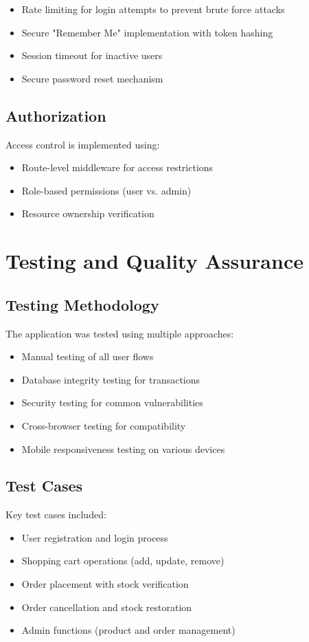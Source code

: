 \documentclass[14pt,a4paper]{article}
\begin{document}
\begin{itemize}
	\item Rate limiting for login attempts to prevent brute force attacks
	\item Secure "Remember Me" implementation with token hashing
	\item Session timeout for inactive users
	\item Secure password reset mechanism
\end{itemize}

\subsection{Authorization}
Access control is implemented using:

\begin{itemize}
	\item Route-level middleware for access restrictions
	\item Role-based permissions (user vs. admin)
	\item Resource ownership verification
\end{itemize}

\section{Testing and Quality Assurance}

\subsection{Testing Methodology}
The application was tested using multiple approaches:

\begin{itemize}
	\item Manual testing of all user flows
	\item Database integrity testing for transactions
	\item Security testing for common vulnerabilities
	\item Cross-browser testing for compatibility
	\item Mobile responsiveness testing on various devices
\end{itemize}

\subsection{Test Cases}
Key test cases included:

\begin{itemize}
	\item User registration and login process
	\item Shopping cart operations (add, update, remove)
	\item Order placement with stock verification
	\item Order cancellation and stock restoration
	\item Admin functions (product and order management)
\end{itemize}
\end{document}
